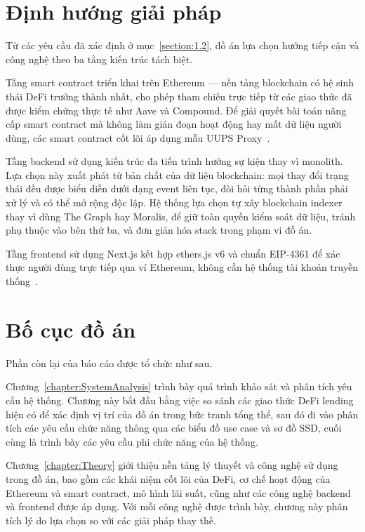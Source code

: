 \documentclass[../DoAn.tex]{subfiles}
\begin{document}
\section{Định hướng giải pháp}
\label{section:1.3}

Từ các yêu cầu đã xác định ở mục~\ref{section:1.2}, đồ án lựa chọn hướng tiếp cận và công nghệ theo ba tầng kiến trúc tách biệt.

Tầng smart contract triển khai trên Ethereum --- nền tảng blockchain có hệ sinh thái DeFi trưởng thành nhất, cho phép tham chiếu trực tiếp từ các giao thức đã được kiểm chứng thực tế như Aave và Compound. Để giải quyết bài toán nâng cấp smart contract mà không làm gián đoạn hoạt động hay mất dữ liệu người dùng, các smart contract cốt lõi áp dụng mẫu UUPS Proxy~\cite{EIP1822,OpenZeppelinDocs}.

Tầng backend sử dụng kiến trúc đa tiến trình hướng sự kiện thay vì monolith. Lựa chọn này xuất phát từ bản chất của dữ liệu blockchain: mọi thay đổi trạng thái đều được biểu diễn dưới dạng event liên tục, đòi hỏi từng thành phần phải xử lý và có thể mở rộng độc lập. Hệ thống lựa chọn tự xây blockchain indexer thay vì dùng The Graph hay Moralis, để giữ toàn quyền kiểm soát dữ liệu, tránh phụ thuộc vào bên thứ ba, và đơn giản hóa stack trong phạm vi đồ án.

Tầng frontend sử dụng Next.js kết hợp ethers.js v6 và chuẩn EIP-4361 để xác thực người dùng trực tiếp qua ví Ethereum, không cần hệ thống tài khoản truyền thống~\cite{EIP4361,EthersJsDocs}.

\section{Bố cục đồ án}
\label{section:1.4}

Phần còn lại của báo cáo được tổ chức như sau.

Chương~\ref{chapter:SystemAnalysis} trình bày quá trình khảo sát và phân tích yêu cầu hệ thống. Chương này bắt đầu bằng việc so sánh các giao thức DeFi lending hiện có để xác định vị trí của đồ án trong bức tranh tổng thể, sau đó đi vào phân tích các yêu cầu chức năng thông qua các biểu đồ use case và sơ đồ SSD, cuối cùng là trình bày các yêu cầu phi chức năng của hệ thống.

Chương~\ref{chapter:Theory} giới thiệu nền tảng lý thuyết và công nghệ sử dụng trong đồ án, bao gồm các khái niệm cốt lõi của DeFi, cơ chế hoạt động của Ethereum và smart contract, mô hình lãi suất, cũng như các công nghệ backend và frontend được áp dụng. Với mỗi công nghệ được trình bày, chương này phân tích lý do lựa chọn so với các giải pháp thay thế.
\end{document}
